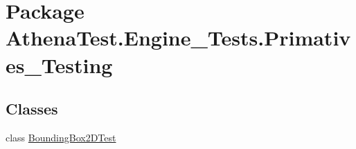 \hypertarget{namespace_athena_test_1_1_engine___tests_1_1_primatives___testing}{\section{Package Athena\-Test.\-Engine\-\_\-\-Tests.\-Primatives\-\_\-\-Testing}
\label{namespace_athena_test_1_1_engine___tests_1_1_primatives___testing}
}
\subsection*{Classes}
\begin{DoxyCompactItemize}
\item 
class \hyperlink{class_athena_test_1_1_engine___tests_1_1_primatives___testing_1_1_bounding_box2_d_test}{Bounding\-Box2\-D\-Test}
\end{DoxyCompactItemize}
